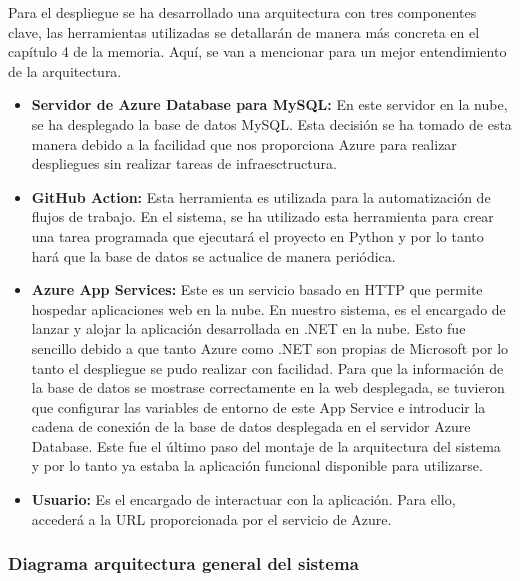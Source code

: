 Para el despliegue se ha desarrollado una arquitectura con tres componentes clave, las herramientas utilizadas se detallarán de manera más concreta en el capítulo 4 de la memoria. Aquí, se van a mencionar para un mejor entendimiento de la arquitectura.
\begin{itemize}
    \item \textbf{Servidor de Azure Database para MySQL:} En este servidor en la nube, se ha desplegado la base de datos MySQL. Esta decisión se ha tomado de esta manera debido a la facilidad que nos proporciona Azure para realizar despliegues sin realizar tareas de infraesctructura.
    \item \textbf{GitHub Action:} Esta herramienta es utilizada para la automatización de flujos de trabajo. En el sistema, se ha utilizado esta herramienta para crear una tarea programada que ejecutará el proyecto en Python y por lo tanto hará que la base de datos se actualice de manera periódica.
    \item \textbf{Azure App Services:} Este es un servicio basado en HTTP que permite hospedar aplicaciones web en la nube. En nuestro sistema, es el encargado de lanzar y alojar la aplicación desarrollada en .NET en la nube. Esto fue sencillo debido a que tanto Azure como .NET son propias de Microsoft por lo tanto el despliegue se pudo realizar con facilidad. Para que la información de la base de datos se mostrase correctamente en la web desplegada, se tuvieron que configurar las variables de entorno de este App Service e introducir la cadena de conexión de la base de datos desplegada en el servidor Azure Database. Este fue el último paso del montaje de la arquitectura del sistema y por lo tanto ya estaba la aplicación funcional disponible para utilizarse.
    \item \textbf{Usuario:} Es el encargado de interactuar con la aplicación. Para ello, accederá a la URL proporcionada por el servicio de Azure.  
\end{itemize}


\newpage
\begin{landscape}
\subsubsection{Diagrama arquitectura general del sistema}
\vspace{2cm}
\label{img-diagrama-general}   
\end{landscape}
\newpage


